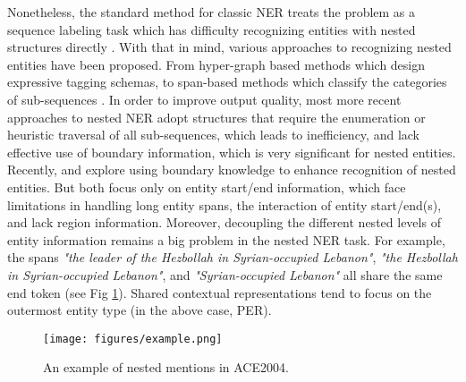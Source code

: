 \documentclass[11pt,a4paper]{article}
\begin{document}
Nonetheless, the standard method for classic NER treats the problem as a sequence labeling task which has difficulty recognizing entities with nested structures directly \cite{alex2007recognising, lu2015joint, katiyar2018nested}. With that in mind, various approaches to recognizing nested entities have been proposed.
From hyper-graph based methods \cite{lu2015joint,wang2018neural,marinho2019hierarchical} which design expressive tagging schemas, to span-based methods which classify the categories of sub-sequences \cite{sohrab2018deep, luan2019general, xia2019multi, fisher2019merge}.
In order to improve output quality, most more recent approaches to nested NER adopt structures that require the enumeration or heuristic traversal of all sub-sequences, which leads to inefficiency, and lack effective use of boundary information, which is very significant for nested entities.
Recently, \citet{zheng2019boundary} and \citet{tan2020boundary} explore using boundary knowledge to enhance recognition of nested entities.
But both focus only on entity start/end information, which face limitations in handling long entity spans, the interaction of entity start/end(s), and lack region information.
Moreover, decoupling the different nested levels of entity information remains a big problem in the nested NER task.
For example, the spans \textit{"the leader of the Hezbollah in Syrian-occupied Lebanon"}, \textit{"the Hezbollah in Syrian-occupied Lebanon"}, and \textit{"Syrian-occupied Lebanon"} all share the same end token (see Fig \ref{fig:example}).
Shared contextual representations tend to focus on the outermost entity type (in the above case, PER).


\begin{figure}[t!]
    \begin{center}
    \texttt{[image: figures/example.png]}
    \caption{An example of nested mentions in ACE2004.}
    \label{fig:example}
    \end{center}
\end{figure} 
\end{document}
